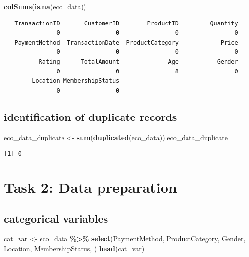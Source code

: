 \documentclass[
]{article}
\newenvironment{Shaded}{\begin{snugshade}}{\end{snugshade}}
\newcommand{\FunctionTok}[1]{\textcolor[rgb]{0.13,0.29,0.53}{\textbf{#1}}}
\newcommand{\NormalTok}[1]{#1}
\newcommand{\OtherTok}[1]{\textcolor[rgb]{0.56,0.35,0.01}{#1}}
\newcommand{\SpecialCharTok}[1]{\textcolor[rgb]{0.81,0.36,0.00}{\textbf{#1}}}
\begin{document}
\begin{Shaded}
\begin{Highlighting}[]
\FunctionTok{colSums}\NormalTok{(}\FunctionTok{is.na}\NormalTok{(eco\_data))}
\end{Highlighting}
\end{Shaded}

\begin{verbatim}
   TransactionID       CustomerID        ProductID         Quantity 
               0                0                0                0 
   PaymentMethod  TransactionDate  ProductCategory            Price 
               0                0                0                0 
          Rating      TotalAmount              Age           Gender 
               0                0                8                0 
        Location MembershipStatus 
               0                0 
\end{verbatim}

\subsection{identification of duplicate
records}\label{identification-of-duplicate-records}

\begin{Shaded}
\begin{Highlighting}[]
\NormalTok{eco\_data\_duplicate }\OtherTok{\textless{}{-}} \FunctionTok{sum}\NormalTok{(}\FunctionTok{duplicated}\NormalTok{(eco\_data))}
\NormalTok{eco\_data\_duplicate}
\end{Highlighting}
\end{Shaded}

\begin{verbatim}
[1] 0
\end{verbatim}

\section{Task 2: Data preparation}\label{task-2-data-preparation}

\subsection{categorical variables}\label{categorical-variables}

\begin{Shaded}
\begin{Highlighting}[]
\NormalTok{cat\_var }\OtherTok{\textless{}{-}}\NormalTok{ eco\_data }\SpecialCharTok{\%\textgreater{}\%}
    \FunctionTok{select}\NormalTok{(PaymentMethod, ProductCategory, Gender, Location, MembershipStatus, )}
\FunctionTok{head}\NormalTok{(cat\_var)}
\end{Highlighting}
\end{Shaded}
\end{document}
